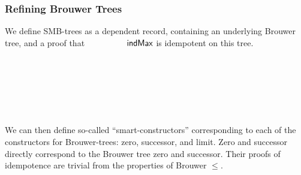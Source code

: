 \subsubsection{Refining Brouwer Trees}

We define SMB-trees as a dependent record,
containing an underlying Brouwer tree, and a proof
that $\indMax$ is idempotent on this tree.

\begin{code}%
\>[0]\AgdaSpace{}%
\AgdaSpace{}%
\AgdaSymbol{:}\AgdaSpace{}%
\AgdaSpace{}%
\AgdaSpace{}%
\<%
\\
\>[0][@{}l@{\AgdaIndent{0}}]%
\>[2]\AgdaSpace{}%
\<%
\\
%
\>[2]\<%
\\
\>[2][@{}l@{\AgdaIndent{0}}]%
\>[4]\AgdaSpace{}%
\AgdaSymbol{:}\AgdaSpace{}%
\<%
\\
%
\>[4]\AgdaSpace{}%
\AgdaSymbol{:}\AgdaSpace{}%
\AgdaSymbol{(}\AgdaSpace{}%
\AgdaSpace{}%
\AgdaSymbol{)}\AgdaSpace{}%
\AgdaSpace{}%
\<%
\\
\>[0]\AgdaSpace{}%
\<%
\end{code}
%

We can then define so-called ``smart-constructors'' corresponding to each of the constructors
for Brouwer-trees: zero, successor, and limit.
Zero and successor directly correspond to the Brouwer tree zero and successor.
Their proofs of idempotence are trivial from the properties of Brouwer $\le$.
\begin{code}%
\>[0]\<%
\\
\>[0][@{}l@{\AgdaIndent{0}}]%
\>[2]\AgdaSpace{}%
\<%
\\
%
\\[\AgdaEmptyExtraSkip]%
%
\>[2]\AgdaSpace{}%
\AgdaSymbol{:}\AgdaSpace{}%
\<%
\\
%
\>[2]\AgdaSpace{}%
\AgdaSymbol{=}\AgdaSpace{}%
\AgdaSpace{}%
\AgdaSpace{}%
\<%
\\
%
\\[\AgdaEmptyExtraSkip]%
%
\>[2]\AgdaSpace{}%
\AgdaSymbol{:}\AgdaSpace{}%
\AgdaSpace{}%
\AgdaSpace{}%
\<%
\\
%
\>[2]\AgdaSpace{}%
\AgdaSymbol{(}\AgdaSpace{}%
\AgdaSpace{}%
\AgdaSymbol{)}\AgdaSpace{}%
\AgdaSymbol{=}\AgdaSpace{}%
\AgdaSpace{}%
\AgdaSymbol{(}\AgdaSpace{}%
\AgdaSymbol{)}\AgdaSpace{}%
\AgdaSymbol{(}\AgdaSpace{}%
\AgdaSymbol{)}\<%
\end{code}

